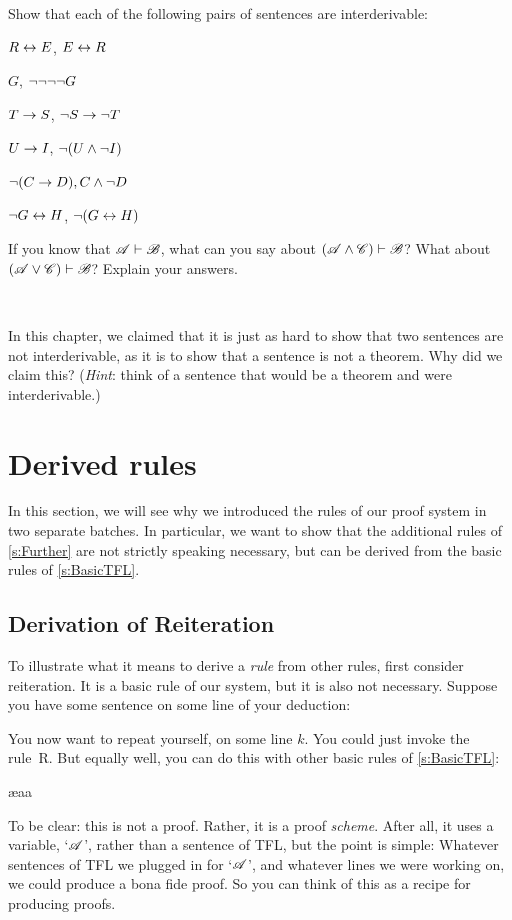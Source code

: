\problempart
Show that each of the following pairs of sentences are interderivable:
\begin{compactlist}
\item $R \leftrightarrow E$, $E \leftrightarrow R$
\item $G$, $\neg\neg\neg\neg G$
\item $T\rightarrow S$, $\neg S \rightarrow \neg T$
\item $U \rightarrow I$, $\neg(U \wedge \neg I)$
\item $\neg (C \rightarrow D), C \wedge \neg D$
\item $\neg G \leftrightarrow H$, $\neg(G \leftrightarrow H)$ 
\end{compactlist}

\problempart
If you know that $\mathscr{A}\vdash\mathscr{B}$, what can you say about $(\mathscr{A}\wedge\mathscr{C})\vdash\mathscr{B}$? What about $(\mathscr{A}\vee\mathscr{C})\vdash\mathscr{B}$? Explain your answers.

\

\problempart In this chapter, we claimed that it is just as hard to show that two sentences are not interderivable, as it is to show that a sentence is not a theorem. Why did we claim this? (\emph{Hint}: think of a sentence that would be a theorem \ifeff{}  and  were interderivable.)


\chapter{Derived rules}\label{s:Derived}
In this section, we will see why we introduced the rules of our proof system in two separate batches. In particular, we want to show that the additional rules of \cref{s:Further} are not strictly speaking necessary, but can be derived from the basic rules of \cref{s:BasicTFL}.

\section{Derivation of Reiteration}
To illustrate what it means to derive a \emph{rule} from other rules, first consider reiteration. It is a basic rule of our system, but it is also not necessary. Suppose you have some sentence on some line of your deduction:
\begin{fitchproof}
\end{fitchproof}
You now want to repeat yourself, on some line $k$. You could just invoke the rule~R. But equally well, you can do this with other basic rules of \cref{s:BasicTFL}:
\begin{fitchproof}
	\ae{aa}
\end{fitchproof}
To be clear: this is not a proof. Rather, it is a proof \emph{scheme}. After all, it uses a variable, `$\mathscr{A}$', rather than a sentence of TFL, but the point is simple: Whatever sentences of TFL we plugged in for `$\mathscr{A}$', and whatever lines we were working on, we could produce a bona fide proof. So you can think of this as a recipe for producing proofs.

